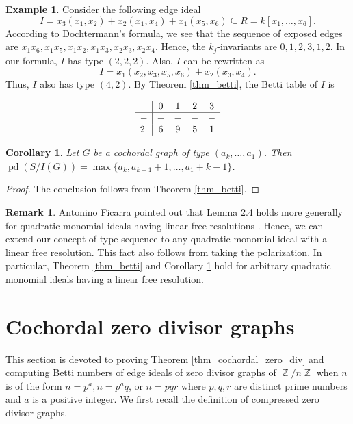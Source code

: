 \documentclass[12pt,amscd]{amsart}
\newtheorem{cor}[thm]{Corollary}
\theoremstyle{definition}
\newtheorem{exm}[thm]{Example}
\newtheorem{rem}[thm]{Remark}
\numberwithin{equation}{section}
\DeclareMathOperator{\ZZ}{\mathbb {Z}}
\DeclareMathOperator{\pd}{pd}
\begin{document}
\begin{exm} Consider the following edge ideal 
$$I = x_3 (x_1,x_2) + x_2(x_1,x_4) + x_1(x_5,x_6)\subseteq R = k[x_1,\ldots,x_6].$$
According to Dochtermann's formula, we see that the sequence of exposed edges are $x_1x_6,x_1x_5,x_1x_2,x_1x_3,x_2x_3,x_2x_4$. Hence, the $k_j$-invariants are $0,1,2,3,1,2$. In our formula, $I$ has type $(2,2,2)$. Also, $I$ can be rewritten as
$$I = x_1(x_2,x_3,x_5,x_6) + x_2(x_3,x_4).$$
Thus, $I$ also has type $(4,2)$. By Theorem \ref{thm_betti}, the Betti table of $I$ is 

    \[\begin{array}{l|c c c c }
            &   0   & 1     & 2     & 3 \\ \hline
        -   &   -   &   -   & -     & - \\
      2   &6    &  9 & 5 & 1
    \end{array}
\]
\end{exm}


\begin{cor}\label{cor_pd} Let $G$ be a cochordal graph of type $(a_k, \ldots, a_1)$. Then 
    $\pd (S/I(G)) = \max \{a_k, a_{k-1}+1, \ldots, a_1 + k -1\}$.
\end{cor}
\begin{proof}
    The conclusion follows from Theorem \ref{thm_betti}.
\end{proof}

\begin{rem} Antonino Ficarra pointed out that Lemma 2.4 holds more generally for quadratic monomial ideals having linear free resolutions \cite[Lemma 2.4]{Fi}. Hence, we can extend our concept of type sequence to any quadratic monomial ideal with a linear free resolution. This fact also follows from taking the polarization. In particular, Theorem \ref{thm_betti} and Corollary \ref{cor_pd} hold for arbitrary quadratic monomial ideals having a linear free resolution.    
\end{rem}
\section{Cochordal zero divisor graphs}\label{sec_zero_div} This section is devoted to proving Theorem \ref{thm_cochordal_zero_div} and computing Betti numbers of edge ideals of zero divisor graphs of $\ZZ/n \ZZ$ when $n$ is of the form $n = p^a, n = p^a q$, or $n = pqr$ where $p,q,r$ are distinct prime numbers and $a$ is a positive integer. We first recall the definition of compressed zero divisor graphs.
\end{document}

